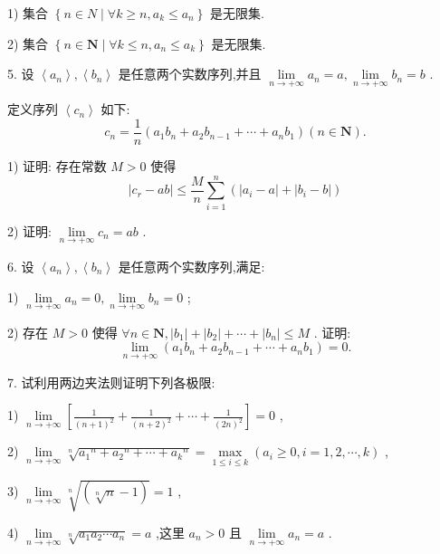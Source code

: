 1) 集合 $\left\{  {n \in  N\mid \forall k \geq  n,{a}_{k} \leq  {a}_{n}}\right\}$ 是无限集.

2) 集合 $\left\{  {n \in  \mathbf{N}\mid \forall k \leq  n,{a}_{n} \leq  {a}_{k}}\right\}$ 是无限集.

5. 设 $\left\langle  {a}_{n}\right\rangle  ,\left\langle  {b}_{n}\right\rangle$ 是任意两个实数序列,并且 $\mathop{\lim }\limits_{{n \rightarrow   + \infty }}{a}_{n} = a,\mathop{\lim }\limits_{{n \rightarrow   + \infty }}{b}_{n} = b$ .

定义序列 $\left\langle  {c}_{n}\right\rangle$ 如下:
$${c}_{n} = \frac{1}{n}\left( {{a}_{1}{b}_{n} + {a}_{2}{b}_{n - 1} + \cdots  + {a}_{n}{b}_{1}}\right) \left( {n \in  \mathbf{N}}\right) .$$

1) 证明: 存在常数 $M > 0$ 使得
$$\left| {{c}_{r} - {ab}}\right|  \leq  \frac{M}{n}\mathop{\sum }\limits_{{i = 1}}^{n}\left( {\left| {{a}_{i} - a}\right|  + \left| {{b}_{i} - b}\right| }\right)$$

2) 证明: $\mathop{\lim }\limits_{{n \rightarrow   + \infty }}{c}_{n} = {ab}$ .

6. 设 $\left\langle  {a}_{n}\right\rangle  ,\left\langle  {b}_{n}\right\rangle$ 是任意两个实数序列,满足:

1) $\mathop{\lim }\limits_{{n \rightarrow   + \infty }}{a}_{n} = 0,\mathop{\lim }\limits_{{n \rightarrow   + \infty }}{b}_{n} = 0$ ;

2) 存在 $M > 0$ 使得 $\forall n \in  \mathbf{N},\left| {b}_{1}\right|  + \left| {b}_{2}\right|  + \cdots  + \left| {b}_{n}\right|  \leq  M$ . 证明:
$$\mathop{\lim }\limits_{{n \rightarrow   + \infty }}\left( {{a}_{1}{b}_{n} + {a}_{2}{b}_{n - 1} + \cdots  + {a}_{n}{b}_{1}}\right)  = 0.$$

7. 试利用两边夹法则证明下列各极限:

1) $\mathop{\lim }\limits_{{n \rightarrow   + \infty }}\left\lbrack  {\frac{1}{{\left( n + 1\right) }^{2}} + \frac{1}{{\left( n + 2\right) }^{2}} + \cdots  + \frac{1}{{\left( 2n\right) }^{2}}}\right\rbrack   = 0$ ,

2) $\mathop{\lim }\limits_{{n \rightarrow   + \infty }}\sqrt[n]{{a}_{1}{}^{n} + {a}_{2}{}^{n} + \cdots  + {a}_{k}{}^{n}} = \mathop{\max }\limits_{{1 \leq  i \leq  k}}\left( {{a}_{i} \geq  0,i = 1,2,\cdots ,k}\right)$ ,

3) $\mathop{\lim }\limits_{{n \rightarrow   + \infty }}\sqrt[n]{\left( \sqrt[n]{n} - 1\right) } = 1$ ,

4) $\mathop{\lim }\limits_{{n \rightarrow   + \infty }}\sqrt[n]{{a}_{1}{a}_{2}\cdots {a}_{n}} = a$ ,这里 ${a}_{n} > 0$ 且 $\mathop{\lim }\limits_{{n \rightarrow   + \infty }}{a}_{n} = a$ .

